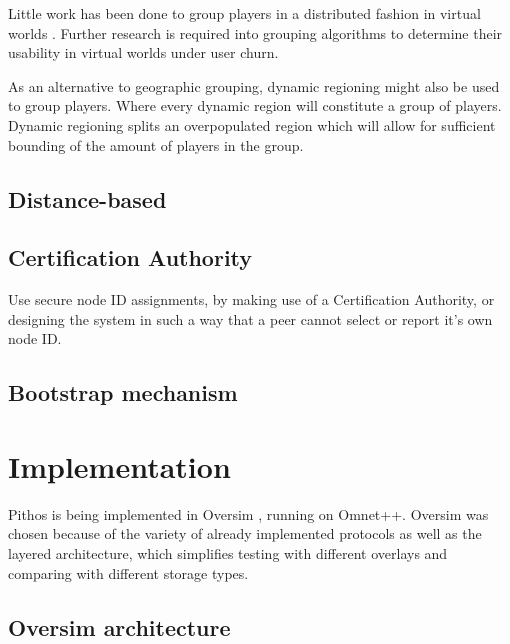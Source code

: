 \documentclass[10pt,a4paper,conference]{IEEEtran}
\begin{document}
Little work has been done to group players in a distributed fashion in virtual worlds \cite{}. Further research is required into grouping algorithms
to determine their usability in virtual worlds under user churn.

As an alternative to geographic grouping, dynamic regioning might also be used to group players. Where every dynamic region will constitute a group
of players. Dynamic regioning splits an overpopulated region which will allow for sufficient bounding of the amount of players in the group.

\subsection{Distance-based}
\label{distance_based}


\subsection{Certification Authority}

Use secure node ID assignments, by making use of a Certification Authority, or designing the system in such a way that a peer cannot select or report
it's own node ID.

\subsection{Bootstrap mechanism}

\section{Implementation}
\label{implementation}

Pithos is being implemented in Oversim \cite{OverSim_2007}, running on Omnet++. Oversim was chosen because of the variety of already implemented
protocols as well as the layered architecture, which simplifies testing with different overlays and comparing with different storage types.

\subsection{Oversim architecture}
\end{document}
